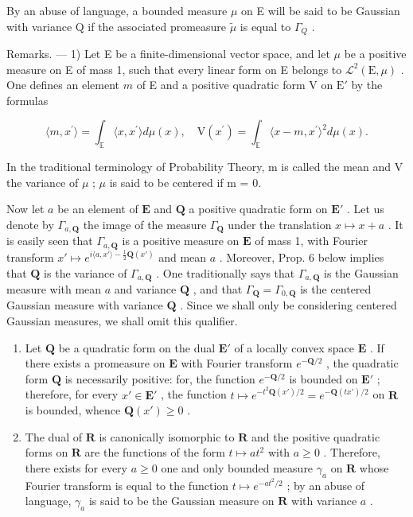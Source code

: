 By an abuse of language, a bounded measure \(\mu\) on E will be said to be Gaussian with variance Q if the associated promeasure \(\widetilde{\mu}\) is equal to \(\Gamma_{Q}\) .

Remarks. --- 1) Let E be a finite-dimensional vector space, and let \(\mu\) be a positive measure on E of mass 1, such that every linear form on E belongs to \(\mathcal{L}^{2}(\mathrm{E},\mu)\) . One defines an element \(m\) of E and a positive quadratic form V on \(\mathrm{E}'\) by the formulas

\[
\langle m, x ^ {\prime} \rangle = \int_ {\mathbb {E}} \langle x, x ^ {\prime} \rangle d \mu (x), \quad \mathrm{V} (x ^ {\prime}) = \int_ {\mathbb {E}} \langle x - m, x ^ {\prime} \rangle^ {2} d \mu (x).
\]

In the traditional terminology of Probability Theory, m is called the mean and V the variance of \(\mu\) ; \(\mu\) is said to be centered if m = 0.

Now let \(a\) be an element of \(\mathbf{E}\) and \(\mathbf{Q}\) a positive quadratic form on \(\mathbf{E}'\) . Let us denote by \(\Gamma_{a,\mathbf{Q}}\) the image of the measure \(\Gamma_{\mathbf{Q}}\) under the translation \(x \mapsto x + a\) . It is easily seen that \(\Gamma_{a,\mathbf{Q}}\) is a positive measure on \(\mathbf{E}\) of mass 1, with Fourier transform \(x' \mapsto e^{i\langle a,x'\rangle - \frac{1}{2}\mathbf{Q}(x')}\) and mean \(a\) . Moreover, Prop. 6 below implies that \(\mathbf{Q}\) is the variance of \(\Gamma_{a,\mathbf{Q}}\) . One traditionally says that \(\Gamma_{a,\mathbf{Q}}\) is the Gaussian measure with mean \(a\) and variance \(\mathbf{Q}\) , and that \(\Gamma_{\mathbf{Q}} = \Gamma_{0,\mathbf{Q}}\) is the centered Gaussian measure with variance \(\mathbf{Q}\) . Since we shall only be considering centered Gaussian measures, we shall omit this qualifier.

\begin{enumerate}
\def\labelenumi{\arabic{enumi})}
\setcounter{enumi}{1}
\item
  Let \(\mathbf{Q}\) be a quadratic form on the dual \(\mathbf{E}'\) of a locally convex space \(\mathbf{E}\) . If there exists a promeasure on \(\mathbf{E}\) with Fourier transform \(e^{-\mathbf{Q} / 2}\) , the quadratic form \(\mathbf{Q}\) is necessarily positive: for, the function \(e^{-\mathbf{Q} / 2}\) is bounded on \(\mathbf{E}'\) ; therefore, for every \(x' \in \mathbf{E}'\) , the function \(t \mapsto e^{-t^2\mathbf{Q}(x') / 2} = e^{-\mathbf{Q}(tx') / 2}\) on \(\mathbf{R}\) is bounded, whence \(\mathbf{Q}(x') \geqslant 0\) .
\item
  The dual of \(\mathbf{R}\) is canonically isomorphic to \(\mathbf{R}\) and the positive quadratic forms on \(\mathbf{R}\) are the functions of the form \(t \mapsto at^2\) with \(a \geqslant 0\) . Therefore, there exists for every \(a \geqslant 0\) one and only bounded measure \(\gamma_a\) on \(\mathbf{R}\) whose Fourier transform is equal to the function \(t \mapsto e^{-at^2/2}\) ; by an abuse of language, \(\gamma_a\) is said to be the Gaussian measure on \(\mathbf{R}\) with variance \(a\) .
\end{enumerate}

